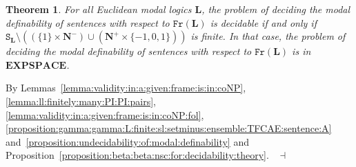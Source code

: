 \documentclass[draft]{article}
\newtheorem{lemma}{Lemma}
\newtheorem{theorem}{Theorem}
\newtheorem{proposition}{Proposition}
\newenvironment{proof}{{\bf Proof:}}{~$\dashv$\\}
\def\Fr{\mathtt{Fr}}
\def\PSPACE{\mathbf{PSPACE}}
\def\EXPSPACE{\mathbf{EXPSPACE}}
\def\L{\mathbf{L}}
\begin{document}
%
%
\begin{theorem}\label{proposition:finale}
%
%
For all Euclidean modal logics $\L$, the problem of deciding the modal definability of sentences with respect to $\Fr(\L)$ is decidable if and only if $\mathtt{S}_{\L}{\setminus}((\{1\}{\times}\mathbf{N}^{-}){\cup}(\mathbf{N}^{+}{\times}\{{-}1,0,1\}))$ is finite.
In that case,
%
%
%
%
%
%
%
%
%
%
%
%
%
%
%
%
%
%
%
%
%
%
%
%
%
%
%
%
%
%
the problem of deciding the modal definability of sentences with respect to $\Fr(\L)$ is in $\EXPSPACE$.
%
%
\end{theorem}
%
%
\begin{proof}
%
%
By Lemmas~\ref{lemma:validity:in:a:given:frame:is:in:coNP}, \ref{lemma:ll:finitely:many:PI:PI:pairs}, \ref{lemma:validity:in:a:given:frame:is:in:coNP:fol}, \ref{proposition:gamma:gamma:L:finite:sl:setminus:ensemble:TFCAE:sentence:A} and~\ref{proposition:undecidability:of:modal:definability} and Proposition~\ref{proposition:beta:beta:nsc:for:decidability:theory}.
%
%
\medskip
%
%
\end{proof}
%
%
%
%
%
%
%
%
%
%
%
%
%
%
%
%
%
%
%
%
%
%
%
%
%
%
%
%
%
%
%
%
%
%
%
%
%
%
%
%
\end{document}
